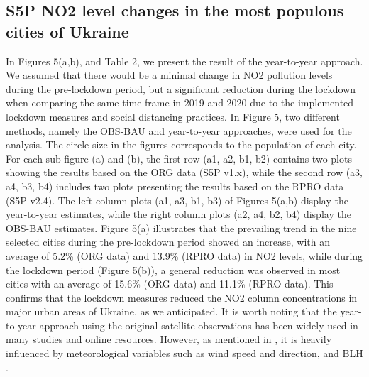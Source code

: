 \subsection{S5P NO2 level changes in the most populous cities of Ukraine}
In Figures 5(a,b), and Table 2, we present the result of the year-to-year approach. We assumed that there would be a minimal change in NO2 pollution levels during the pre-lockdown period, but a significant reduction during the lockdown when comparing the same time frame in 2019 and 2020 due to the implemented lockdown measures and social distancing practices. In Figure 5, two different methods, namely the OBS-BAU and year-to-year approaches, were used for the analysis. The circle size in the figures corresponds to the population of each city. For each sub-figure (a) and (b), the first row (a1, a2, b1, b2) contains two plots showing the results based on the ORG data (S5P v1.x), while the second row (a3, a4, b3, b4) includes two plots presenting the results based on the RPRO data (S5P v2.4). The left column plots (a1, a3, b1, b3) of Figures 5(a,b) display the year-to-year estimates, while the right column plots (a2, a4, b2, b4) display the OBS-BAU estimates. Figure 5(a) illustrates that the prevailing trend in the nine selected cities during the pre-lockdown period showed an increase, with an average of 5.2\% (ORG data) and 13.9\% (RPRO data) in NO2 levels, while during the lockdown period (Figure 5(b)), a general reduction was observed in most cities with an average of 15.6\% (ORG data) and 11.1\% (RPRO data). This confirms that the lockdown measures reduced the NO2 column concentrations in major urban areas of Ukraine, as we anticipated. It is worth noting that the year-to-year approach using the original satellite observations has been widely used in many studies and online resources. However, as mentioned in \citep{barre2021estimating,grange2021covid}, it is heavily influenced by meteorological variables such as wind speed and direction, and BLH \citep{wallace2009effect}.\par

